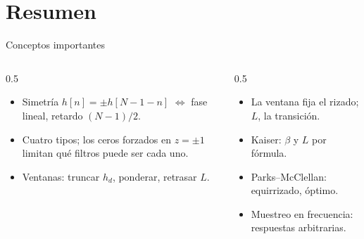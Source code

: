\documentclass[aspectratio=169,11pt]{beamer}
\begin{document}
\section*{Resumen}
\begin{frame}{Conceptos importantes}
  \begin{columns}[T]
    \begin{column}{0.5\textwidth}
      \begin{itemize}
        \item Simetría $h[n]=\pm h[N-1-n]$ $\Leftrightarrow$ fase lineal, retardo $(N-1)/2$.
        \item Cuatro tipos; los ceros forzados en $z=\pm1$ limitan qué filtros puede ser cada uno.
        \item Ventanas: truncar $h_d$, ponderar, retrasar $L$.
      \end{itemize}
    \end{column}
    \begin{column}{0.5\textwidth}
      \begin{itemize}
        \item La ventana fija el rizado; $L$, la transición.
        \item Kaiser: $\beta$ y $L$ por fórmula.
        \item Parks–McClellan: equirrizado, óptimo.
        \item Muestreo en frecuencia: respuestas arbitrarias.
      \end{itemize}
    \end{column}
  \end{columns}
  \bigskip
\end{frame}
\end{document}
